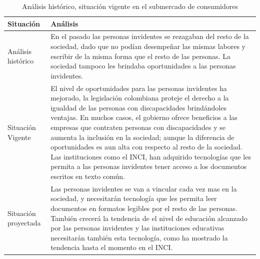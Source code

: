 \documentclass[a4paper, 12pt, oneside]{article}
\begin{document}
	\begin{table}
		\caption{Análisis histórico, situación vigente en el submercado de consumidores}
		\begin{tabular}{ | p{4cm} | p{10cm} | }
		\hline
		Situación & Análisis \\
		\hline					
		Análisis histórico & 
		En el pasado las personas invidentes se rezagaban del resto de la sociedad, dado que no podían desempeñar las mismas labores y escribir de la misma forma que el resto de las personas. La sociedad tampoco les brindaba oportunidades a las personas invidentes. \\
		\hline
		Situación Vigente &
		El nivel de oportunidades para las personas invidentes ha mejorado, la legislación colombiana proteje el derecho a la igualdad de las personas con discapacidades brindándoles ventajas. En muchos casos, el gobierno ofrece beneficios a las empresas que contraten personas con discapacidades y se aumenta la inclusión en la sociedad; aunque la diferencia de oportunidades es aun alta con respecto al resto de la sociedad. Las instituciones como el INCI, han adquirido tecnologías que les permita a las personas invidentes tener acceso a los documentos escritos en texto común. \\
		\hline
		Situación proyectada &
		Las personas invidentes se van a vincular cada vez mas en la sociedad, y necesitarán tecnología que les permita leer documentos en formatos legibles por el resto de las personas. También crecerá la tendencia de el nivel de educación alcanzado por las personas invidentes y las instituciones educativas necesitarán también esta tecnología, como ha mostrado la tendencia hasta el momento en el INCI.
		 \\
		\hline
		\end{tabular}
		\label{consHistorico}
	\end{table}
	
\end{document}

